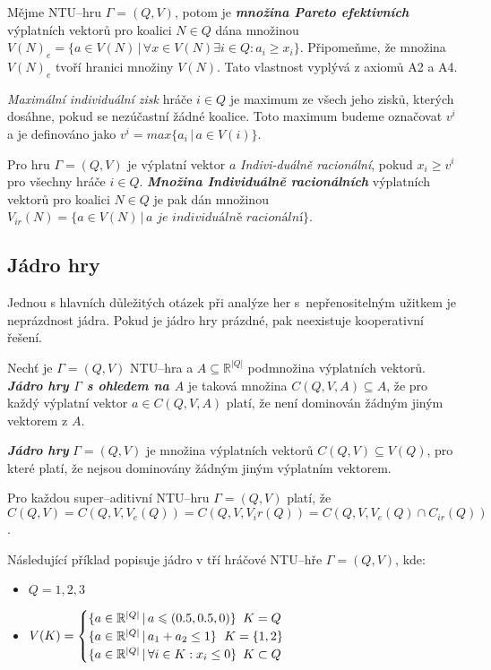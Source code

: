         Mějme NTU--hru $\Gamma = (Q, V)$, potom je \textit{\textbf{množina Pareto efektivních}} výplatních vektorů pro koalici $N \in Q$ dána množinou $V(N)_e = \{a \in V(N)\,|\,\forall x \in V(N) \exists i \in Q: a_i \geq x_i\}$. Připomeňme, že množina $V(N)_e$ tvoří hranici množiny $V(N)$. Tato vlastnost vyplývá z axiomů A2 a A4.

        \textit{Maximální individuální zisk} hráče $i \in Q$ je maximum ze všech jeho zisků, kterých dosáhne, pokud se nezúčastní žádné koalice. Toto maximum budeme označovat $v^i$ a je definováno jako $v^i = max\{a_i\,|\, a \in V({i})\}$.

        Pro hru $\Gamma = (Q, V)$ je výplatní vektor $a$ \textit{Indivi-duálně racionální}, pokud $x_i \geq v^i$ pro všechny hráče $i \in Q$. \textit{\textbf{Množina Individuálně racionálních}} výplatních vektorů pro koalici $N \in Q$ je pak dán množinou $V_{ir}(N) = \{a \in V(N)\,|\, a \textit{ je individuálně racionální}\}$.

    \subsection{Jádro hry}
        Jednou s hlavních důležitých otázek při analýze her s~nepřenositelným užitkem je neprázdnost jádra. Pokud je jádro hry prázdné, pak neexistuje kooperativní řešení.

        Nechť je $\Gamma = (Q, V)$ NTU--hra a $A \subseteq \mathbb{R}^{|Q|}$ podmnožina výplatních vektorů. \textit{\textbf{Jádro hry $\Gamma$ s ohledem na $A$}} je taková množina $C(Q, V, A) \subseteq A$, že pro každý výplatní vektor $a \in C(Q, V, A)$ platí, že není dominován žádným jiným vektorem z $A$.

        \textit{\textbf{Jádro hry}} $\Gamma = (Q, V)$ je množina výplatních vektorů $C(Q, V) \subseteq V(Q)$, pro které platí, že nejsou dominovány žádným jiným výplatním vektorem.

        Pro každou super--aditivní NTU--hru $\Gamma = (Q, V)$ platí, že $C(Q, V) = C(Q, V, V_e(Q)) = C(Q, V, V_ir(Q)) = C(Q, V, V_e(Q) \cap C_{ir}(Q))$.

        Následující příklad popisuje jádro v tří hráčové NTU--hře $\Gamma = (Q, V)$, kde:

        \begin{itemize}
            \vspace*{-0.3em}
            \item $Q = 1, 2, 3$
            \item $V(K) = \begin{cases}
                \{a \in \mathbb{R}^{|Q|}\,|\, a \leqslant (0.5, 0.5, 0)\} & \hspace*{-0.5em}K = Q\\
                \{a \in \mathbb{R}^{|Q|}\,|\, a_1 + a_2 \leq 1\} & \hspace*{-2em}K = \{1, 2\}\\
                \{a \in \mathbb{R}^{|Q|}\,|\, \forall i \in K: x_i \leq 0\} & \hspace*{-0.5em}K \subset Q
            \end{cases}$
        \end{itemize}

